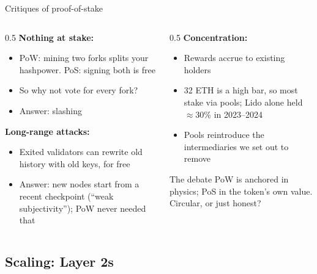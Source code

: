 \ifdefined\PRESENTATION\else\PassOptionsToClass{handout}{beamer}\fi\documentclass[aspectratio=169, lualatex]{beamer}
\begin{document}
\begin{frame}{Critiques of proof-of-stake}
	\begin{columns}[c]
		\begin{column}{0.5\textwidth}
			\textbf{Nothing at stake:}
			\begin{itemize}
				\item PoW: mining two forks splits your hashpower. PoS: signing both is free
				\item So why not vote for every fork?
				\item Answer: slashing
			\end{itemize}
			\textbf{Long-range attacks:}
			\begin{itemize}
				\item Exited validators can rewrite old history with old keys, for free
				\item Answer: new nodes start from a recent checkpoint (``weak subjectivity''); PoW never needed that
			\end{itemize}
		\end{column}
		\begin{column}{0.5\textwidth}
			\textbf{Concentration:}
			\begin{itemize}
				\item Rewards accrue to existing holders
				\item 32 ETH is a high bar, so most stake via pools; Lido alone held $\approx$30\% in 2023--2024
				\item Pools reintroduce the intermediaries we set out to remove
			\end{itemize}
			\begin{alertblock}{The debate}
				PoW is anchored in physics; PoS in the token's own value. Circular, or just honest?
			\end{alertblock}
		\end{column}
	\end{columns}
\end{frame}

\subsection{Scaling: Layer 2s}
\end{document}
